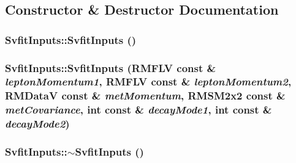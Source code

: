 \subsection{Constructor \& Destructor Documentation}
\hypertarget{classSvfitInputs_a358e4bb19752369a54877771ce45f792}{
\subsubsection[{SvfitInputs}]{\setlength{\rightskip}{0pt plus 5cm}SvfitInputs::SvfitInputs ()}}
\label{classSvfitInputs_a358e4bb19752369a54877771ce45f792}
\hypertarget{classSvfitInputs_a64fef6674fbff8c5151d456d2181d55f}{
\subsubsection[{SvfitInputs}]{\setlength{\rightskip}{0pt plus 5cm}SvfitInputs::SvfitInputs (RMFLV const \& {\em leptonMomentum1}, \/  RMFLV const \& {\em leptonMomentum2}, \/  {\bf RMDataV} const \& {\em metMomentum}, \/  {\bf RMSM2x2} const \& {\em metCovariance}, \/  int const \& {\em decayMode1}, \/  int const \& {\em decayMode2})}}
\label{classSvfitInputs_a64fef6674fbff8c5151d456d2181d55f}
\hypertarget{classSvfitInputs_aa972c71e023c7d68e2ad587bea6ba05b}{
\subsubsection[{$\sim$SvfitInputs}]{\setlength{\rightskip}{0pt plus 5cm}SvfitInputs::$\sim$SvfitInputs ()}}
\label{classSvfitInputs_aa972c71e023c7d68e2ad587bea6ba05b}


